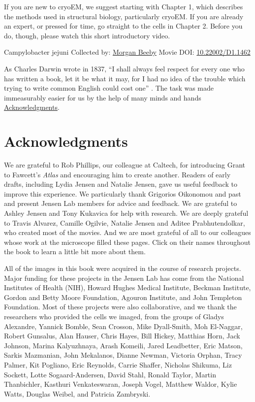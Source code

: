 \documentclass[]{tufte-book}
\begin{document}
If you are new to cryoEM, we suggest starting with Chapter 1, which describes the methods used in structural biology, particularly cryoEM. If you are already an expert, or pressed for time, go straight to the cells in Chapter 2. Before you do, though, please watch this short introductory video.



\hypertarget{htmlwidget-2b13b59154cf4283baad}{}

\label{fig:0-1}Campylobacter jejuni Collected by: \protect\hyperlink{morgan_beeby}{Morgan Beeby} Movie DOI: \href{https://doi.org/10.22002/D1.1462}{10.22002/D1.1462}

As Charles Darwin wrote in 1837, ``I shall always feel respect for every one who has written a book, let it be what it may, for I had no idea of the trouble which trying to write common English could cost one'' \citep{darwin1888}. The task was made immeasurably easier for us by the help of many minds and hands \protect\hyperlink{acknowledgments}{Acknowledgments}.

\hypertarget{acknowledgments}{%
\section*{Acknowledgments}\label{acknowledgments}}

We are grateful to Rob Phillips, our colleague at Caltech, for introducing Grant to Fawcett's \emph{Atlas} and encouraging him to create another. Readers of early drafts, including Lydia Jensen and Natalie Jensen, gave us useful feedback to improve this experience. We particularly thank Grigorios Oikonomou and past and present Jensen Lab members for advice and feedback. We are grateful to Ashley Jensen and Tony Kukavica for help with research. We are deeply grateful to Travis Alvarez, Camille Ogilvie, Natalie Jensen and Aditee Prabhutendolkar, who created most of the movies. And we are most grateful of all to our colleagues whose work at the microscope filled these pages. Click on their names throughout the book to learn a little bit more about them.

All of the images in this book were acquired in the course of research projects. Major funding for these projects in the Jensen Lab has come from the National Institutes of Health (NIH), Howard Hughes Medical Institute, Beckman Institute, Gordon and Betty Moore Foundation, Agouron Institute, and John Templeton Foundation. Most of these projects were also collaborative, and we thank the researchers who provided the cells we imaged, from the groups of Gladys Alexandre, Yannick Bomble, Sean Crosson, Mike Dyall-Smith, Moh El-Naggar, Robert Gunsalus, Alan Hauser, Chris Hayes, Bill Hickey, Matthias Horn, Jack Johnson, Marina Kalyuzhnaya, Arash Komeili, Jared Leadbetter, Eric Matson, Sarkis Mazmanian, John Mekalanos, Dianne Newman, Victoria Orphan, Tracy Palmer, Kit Pogliano, Eric Reynolds, Carrie Shaffer, Nicholas Shikuma, Liz Sockett, Lotte Sogaard-Andersen, David Stahl, Ronald Taylor, Martin Thanbichler, Kasthuri Venkateswaran, Joseph Vogel, Matthew Waldor, Kylie Watts, Douglas Weibel, and Patricia Zambryski.
\end{document}
